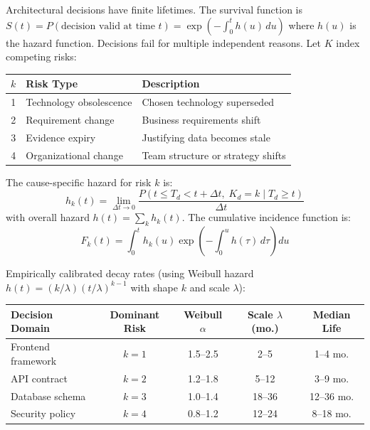 \documentclass[11pt, a4paper]{googledeepmind}
\begin{document}
Architectural decisions have finite lifetimes. The survival function is $S(t) = P(\text{decision valid at time } t) = \exp\left(-\int_0^t h(u) \, du\right)$ where $h(u)$ is the hazard function. Decisions fail for multiple independent reasons. Let $K$ index competing risks:

\begin{center}
\begin{tabular}{clp{7cm}}
\toprule
$k$ & Risk Type & Description \\
\midrule
1 & Technology obsolescence & Chosen technology superseded \\
2 & Requirement change & Business requirements shift \\
3 & Evidence expiry & Justifying data becomes stale \\
4 & Organizational change & Team structure or strategy shifts \\
\bottomrule
\end{tabular}
\end{center}

The cause-specific hazard for risk $k$ is:
\begin{equation}
    h_k(t) = \lim_{\Delta t \to 0} \frac{P(t \leq T_d < t + \Delta t, \; K_d = k \mid T_d \geq t)}{\Delta t}
\end{equation}
with overall hazard $h(t) = \sum_k h_k(t)$. The cumulative incidence function is:
\begin{equation}
    F_k(t) = \int_0^t h_k(u) \exp\!\left(-\int_0^u h(\tau)\, d\tau\right) du
\end{equation}

Empirically calibrated decay rates (using Weibull hazard $h(t) = (k/\lambda)(t/\lambda)^{k-1}$ with shape $k$ and scale $\lambda$):

\begin{center}
\begin{tabular}{lcccc}
\toprule
Decision Domain & Dominant Risk & Weibull $\alpha$ & Scale $\lambda$ (mo.) & Median Life \\
\midrule
Frontend framework & $k=1$ & 1.5--2.5 & 2--5 & 1--4 mo. \\
API contract & $k=2$ & 1.2--1.8 & 5--12 & 3--9 mo. \\
Database schema & $k=3$ & 1.0--1.4 & 18--36 & 12--36 mo. \\
Security policy & $k=4$ & 0.8--1.2 & 12--24 & 8--18 mo. \\
\bottomrule
\end{tabular}
\end{center}
\end{document}
